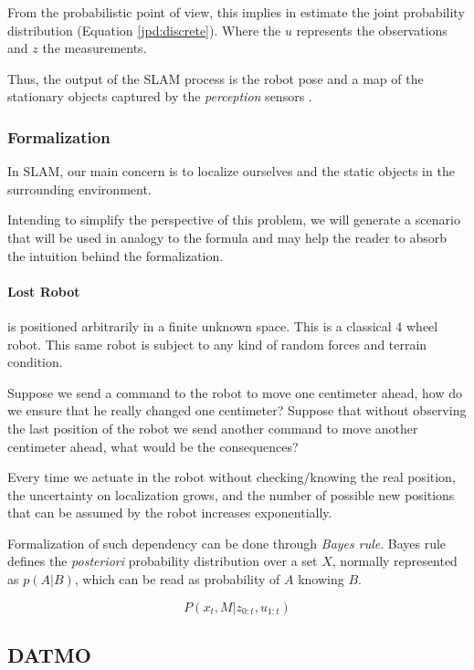 From the probabilistic point of view, this implies in estimate the joint probability distribution (Equation \ref{jpd:discrete}). Where the $u$ represents the observations and $z$ the measurements.

Thus, the output of the SLAM process is the robot pose and a map of the stationary objects captured by the \textit{perception} sensors \cite{iyengar1991autonomous}.

\subsubsection{Formalization}

In SLAM, our main concern is to localize ourselves and the static objects in the surrounding environment. 

Intending to simplify the perspective of this problem, we will generate a scenario that will be used in analogy to the formula and may help the reader to absorb the intuition behind the formalization.

\paragraph*{Lost Robot} is positioned arbitrarily in a finite unknown space. This is a classical 4 wheel robot. This same robot is subject to any kind of random forces and terrain condition. 

Suppose we send a command to the robot to move one centimeter ahead, how do we ensure that he really changed one centimeter? Suppose that without observing the last position of the robot we send another command to move another centimeter ahead, what would be the consequences? 

Every time we actuate in the robot without checking/knowing the real position, the uncertainty on localization grows, and the number of possible new positions that can be assumed by the robot increases exponentially.

Formalization of such dependency can be done through \textit{Bayes rule}. Bayes rule defines the \textit{posteriori} probability distribution over a set $X$, normally represented as $p(A | B)$, which can be read as probability of $A$ knowing $B$.

\begin{equation}
\label{jpd:discrete}
P(x_t,M | z_{0:t}, u_{1:t})
\end{equation}

\subsection{DATMO}

